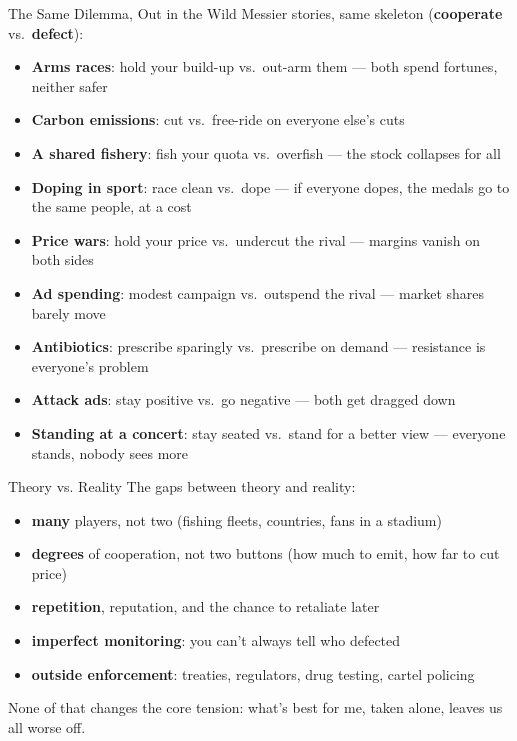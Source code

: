 \begin{frame}{The Same Dilemma, Out in the Wild}
Messier stories, same skeleton (\textbf{cooperate} vs.\ \textbf{defect}):
\bsk
{\small
\begin{itemize}
    \item \textbf{Arms races}: hold your build-up vs.\ out-arm them --- both spend fortunes, neither safer
    \item \textbf{Carbon emissions}: cut vs.\ free-ride on everyone else's cuts
    \item \textbf{A shared fishery}: fish your quota vs.\ overfish --- the stock collapses for all
    \item \textbf{Doping in sport}: race clean vs.\ dope --- if everyone dopes, the medals go to the same people, at a cost
    \item \textbf{Price wars}: hold your price vs.\ undercut the rival --- margins vanish on both sides
    \item \textbf{Ad spending}: modest campaign vs.\ outspend the rival --- market shares barely move
    \item \textbf{Antibiotics}: prescribe sparingly vs.\ prescribe on demand --- resistance is everyone's problem
    \item \textbf{Attack ads}: stay positive vs.\ go negative --- both get dragged down
    \item \textbf{Standing at a concert}: stay seated vs.\ stand for a better view --- everyone stands, nobody sees more
\end{itemize}}
\end{frame}

\begin{frame}{Theory vs. Reality}
The gaps between theory and reality:
\begin{itemize}
    \item \textbf{many} players, not two (fishing fleets, countries, fans in a stadium)
    \item \textbf{degrees} of cooperation, not two buttons (how much to emit, how far to cut price)
    \item \textbf{repetition}, reputation, and the chance to retaliate later
    \item \textbf{imperfect monitoring}: you can't always tell who defected
    \item \textbf{outside enforcement}: treaties, regulators, drug testing, cartel policing
\end{itemize}
\bsk
None of that changes the core tension:
\vfill
\centering
\large
what's best for me, taken alone, leaves us all worse off.
\vfill
\end{frame}

